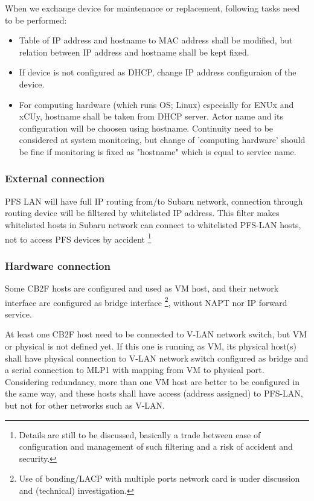 \documentclass[a4paper,notitlepage]{article}
\begin{document}
When we exchange device for maintenance or replacement, following tasks need 
to be performed:

\begin{itemize}
  \item Table of IP address and hostname to MAC address shall be modified, but 
    relation between IP address and hostname shall be kept fixed. 
  \item If device is not configured as DHCP, change IP address configuraion 
    of the device.
  \item For computing hardware (which runs OS; Linux) especially for ENUx and 
    xCUy, hostname shall be taken from DHCP server. Actor name and its 
    configuration will be choosen using hostname. Continuity need to be 
    considered at system monitoring, but change of 'computing hardware' should 
    be fine if monitoring is fixed as "hostname" which is equal to service 
    name. 
\end{itemize}

\subsubsection{External connection}

PFS LAN will have full IP routing from/to Subaru network, connection through 
routing device will be filltered by whitelisted IP address. This filter makes 
whitelisted hosts in Subaru network can connect to whitelisted PFS-LAN hosts, 
not to access PFS devices by accident
\footnote{Details are still to be discussed, basically a trade between ease 
of configuration and management of such filtering and a risk of accident and 
security.}

\subsubsection{Hardware connection}

Some CB2F hosts are configured and used as VM host, and their network interface 
are configured as bridge interface
\footnote{Use of bonding/LACP with multiple ports network card is under 
discussion and (technical) investigation.}, without NAPT nor IP forward 
service. 

At least one CB2F host need to be connected to V-LAN network switch, but VM or 
physical is not defined yet. If this one is running as VM, its physical host(s) 
shall have physical connection to V-LAN network switch configured as bridge and 
a serial connection to MLP1 with mapping from VM to physical port. Considering 
redundancy, more than one VM host are better to be configured in the same way, 
and these hosts shall have access (address assigned) to PFS-LAN, but not for 
other networks such as V-LAN. 
\end{document}
